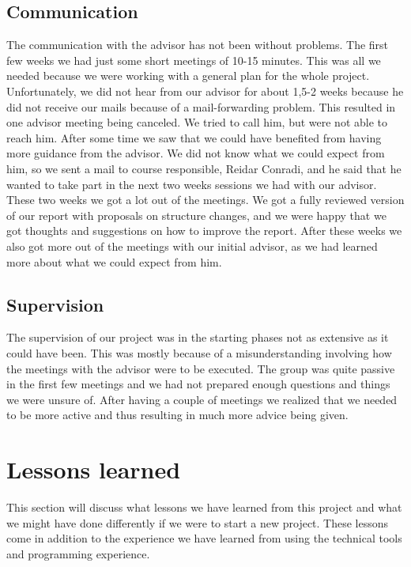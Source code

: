 \subsection{Communication}
The communication with the advisor has not been without problems. The first few weeks we had just some short meetings of 10-15 minutes. This was all we needed because we were working with a general plan for the whole project.
\newline
\newline
Unfortunately, we did not hear from our advisor for about 1,5-2 weeks because he did not receive our mails because of a mail-forwarding problem. This resulted in one advisor meeting being canceled. We tried to call him, but were not able to reach him.
\newline
\newline
After some time we saw that we could have benefited from having more guidance from the advisor. We did not know what we could expect from him, so we sent a mail to course responsible, Reidar Conradi, and he said that he wanted to take part in the next two weeks sessions we had with our advisor.
\newline
\newline
These two weeks we got a lot out of the meetings. We got a fully reviewed version of our report with proposals on structure changes, and we were happy that we got thoughts and suggestions on how to improve the report. After these weeks we also got more out of the meetings with our initial advisor, as we had learned more about what we could expect from him.

\subsection{Supervision}
The supervision of our project was in the starting phases not as extensive as it could have been. This was mostly because of a misunderstanding involving how the meetings with the advisor were to be executed. The group was quite passive in the first few meetings and we had not prepared enough questions and things we were unsure of. After having a couple of meetings we realized that we needed to be more active and thus resulting in much more advice being given.

\section{Lessons learned}\label{sec:refl_lessons}
This section will discuss what lessons we have learned from this project and what we might have done differently if we were to start a new project. These lessons come in addition to the experience we have learned from using the technical tools and programming experience.

